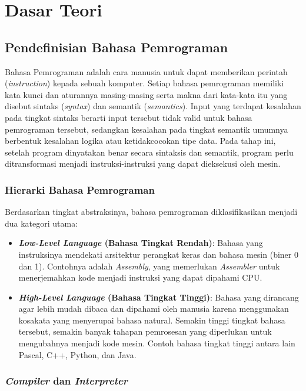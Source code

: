 \documentclass[12pt,a4paper]{article}
\begin{document}
\section{Dasar Teori}

\subsection{Pendefinisian Bahasa Pemrograman}

Bahasa Pemrograman adalah cara manusia untuk dapat memberikan perintah
(\textit{instruction}) kepada sebuah komputer. Setiap bahasa pemrograman
memiliki kata kunci dan aturannya masing-masing serta makna dari kata-kata itu
yang disebut sintaks (\textit{syntax}) dan semantik (\textit{semantics}).
Input yang terdapat kesalahan pada tingkat sintaks berarti input tersebut tidak
valid untuk bahasa pemrograman tersebut, sedangkan kesalahan pada tingkat
semantik umumnya berbentuk kesalahan logika atau ketidakcocokan tipe data.
Pada tahap ini, setelah program dinyatakan benar secara sintaksis dan semantik,
program perlu ditransformasi menjadi instruksi-instruksi yang dapat dieksekusi
oleh mesin.

\subsubsection{Hierarki Bahasa Pemrograman}

Berdasarkan tingkat abstraksinya, bahasa pemrograman diklasifikasikan menjadi
dua kategori utama:
\begin{itemize}
    \item \textbf{\textit{Low-Level Language} (Bahasa Tingkat Rendah)}: Bahasa
        yang instruksinya mendekati arsitektur perangkat keras dan bahasa mesin
        (biner 0 dan 1). Contohnya adalah \textit{Assembly}, yang memerlukan
        \textit{Assembler} untuk menerjemahkan kode menjadi instruksi yang dapat
        dipahami CPU.
    \item \textbf{\textit{High-Level Language} (Bahasa Tingkat Tinggi)}: Bahasa
        yang dirancang agar lebih mudah dibaca dan dipahami oleh manusia karena
        menggunakan kosakata yang menyerupai bahasa natural. Semakin tinggi
        tingkat bahasa tersebut, semakin banyak tahapan pemrosesan yang diperlukan
        untuk mengubahnya menjadi kode mesin. Contoh bahasa tingkat tinggi antara
        lain Pascal, C++, Python, dan Java.
\end{itemize}

\subsubsection{\textit{Compiler} dan \textit{Interpreter}}
\end{document}

